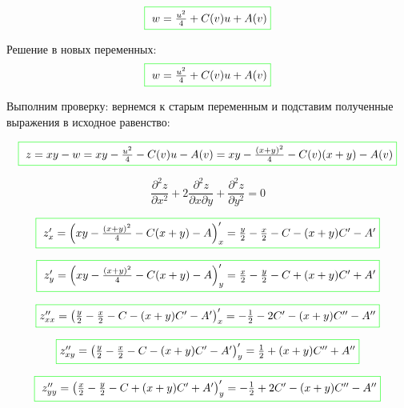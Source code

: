 \documentclass[a5paper, 10pt]{article}
\theoremstyle{definition}
\theoremstyle{plain}
\theoremstyle{remark}
\begin{document}
\begin{equation}
\fcolorbox{green}{white}{ $ w =  \frac{u^2}{4} + C(v)u + A(v) $}
\end{equation}

Решение в новых переменных:
\begin{equation}
\fcolorbox{green}{white}{ $ w =  \frac{u^2}{4} + C(v)u + A(v)$}
\end{equation}

Выполним проверку: вернемся к старым переменным и подставим полученные выражения в исходное равенство:

\begin{equation}
\fcolorbox{green}{white}{ $z = xy - w = xy -  \frac{u^2}{4} - C(v)u - A(v) =  xy -  \frac{( x + y)^2}{4} - C(v)( x + y) - A(v) $}
\end{equation}

\begin{equation}
\frac{\partial^2 z}{\partial x^2} + 2 \frac{\partial^2 z}{\partial x \partial y} + \frac{\partial^2 z}{\partial y^2} = 0
\end{equation}

\begin{equation}
\fcolorbox{green}{white}{ $z'_x = \left(  xy -  \frac{( x + y)^2}{4} - C( x + y) - A \right)'_x = \frac{y}{2} - \frac{ x}{2} -C - (x + y) C' - A' $}
\end{equation}


\begin{equation}
\fcolorbox{green}{white}{ $z'_y = \left(  xy -  \frac{( x + y)^2}{4} - C( x + y) - A \right)'_y  = \frac{x}{2} - \frac{y}{2} -C + (x+y)C' + A' $}
\end{equation}

\begin{equation}
\fcolorbox{green}{white}{$z''_{xx} = \left( \frac{y}{2} - \frac{ x}{2} -C - (x + y) C' - A' \right)'_x =  - \frac{ 1}{2}  - 2C' -  (x + y)C'' - A''$}
\end{equation}

\begin{equation}
\fcolorbox{green}{white}{$z''_{xy} = \left(  \frac{y}{2} - \frac{ x}{2} -C - (x + y) C' - A' \right)'_y =   \frac{ 1}{2} + (x + y)C'' + A'' $}
\end{equation}

\begin{equation}
\fcolorbox{green}{white}{ $z''_{yy} = \left(  \frac{x}{2} - \frac{y}{2} -C + (x+y)C' + A'  \right)'_y =  - \frac{ 1}{2} + 2 C' - (x+y)C'' - A''$}
\end{equation}
\end{document}
